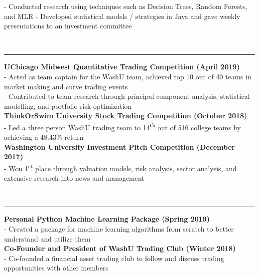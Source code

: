 \documentclass[11pt]{article}
\begin{document}
\begin{titlepage}
\begin{addmargin}[1em]{0em}
- Conducted research using techniques such as Decision Trees, Random Forests, and MLR\newline
- Developed statistical models / strategies in Java and gave weekly presentations to an investment committee\newline
		\end{addmargin}
		\vspace{-10pt}
		\noindent
		\\\rule{\textwidth}{0.4pt}
		\begin{addmargin}[1em]{0em}
			\textbf{UChicago Midwest Quantitative Trading Competition \hfill (April 2019)}\\
- Acted as team captain for the WashU team, achieved top 10 out of 40 teams in market making and curve trading events\\
- Contributed to team research through principal component analysis, statistical modelling, and portfolio risk optimization\\
			\textbf{ThinkOrSwim University Stock Trading Competition \hfill (October 2018)}\\
- Led a three person WashU trading team to 14\textsuperscript{th} out of 516 college teams by achieving a 48.43\% return\\
			\textbf{Washington University Investment Pitch Competition \hfill (December 2017)}\\
- Won 1\textsuperscript{st} place through valuation models, risk analysis, sector analysis, and extensive research into news and management\\
		\end{addmargin}
		\vspace{-10pt}
		\noindent
		\\\rule{\textwidth}{0.4pt}
		\begin{addmargin}[1em]{0em}
			\textbf{Personal Python Machine Learning Package \hfill (Spring 2019)}\\
- Created a package for machine learning algorithms from scratch to better understand and utilize them\\
			\textbf{Co-Founder and President of WashU Trading Club \hfill (Winter 2018)}\\
- Co-founded a financial asset trading club to follow and discuss trading opportunities with other members\\

\end{addmargin}
\end{titlepage}
\end{document}
